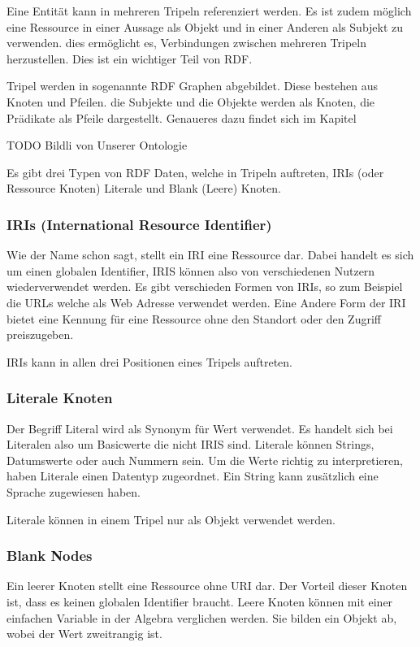 Eine Entität kann in mehreren Tripeln referenziert werden. Es ist zudem möglich eine Ressource in einer Aussage als Objekt und in einer Anderen als Subjekt zu verwenden. dies ermöglicht es, Verbindungen zwischen mehreren Tripeln herzustellen. Dies ist ein wichtiger Teil von RDF.

Tripel werden in sogenannte RDF Graphen abgebildet. Diese bestehen aus Knoten und Pfeilen. die Subjekte und die Objekte werden als Knoten, die Prädikate als Pfeile dargestellt. Genaueres dazu findet sich im Kapitel 



TODO Bildli von Unserer Ontologie

Es gibt drei Typen von RDF Daten, welche in Tripeln auftreten, IRIs (oder Ressource Knoten) Literale und Blank (Leere) Knoten.

\subsubsection{IRIs (International Resource Identifier)}
\label{sec:owlRdf_rdf_dataModel_iris}
Wie der Name schon sagt, stellt ein IRI  eine Ressource dar. Dabei handelt es sich um einen globalen Identifier, IRIS können also von verschiedenen Nutzern wiederverwendet werden. Es gibt verschieden Formen von IRIs, so zum Beispiel die URLs welche als Web Adresse verwendet werden. Eine Andere Form der IRI bietet eine Kennung für eine Ressource ohne den Standort oder den Zugriff preiszugeben.%

\noindent\hspace*{15mm}IRIs kann in allen drei Positionen eines Tripels auftreten.

\subsubsection{Literale Knoten}
\label{sec:owlRdf_rdf_dataModel_literal}
Der Begriff Literal wird als Synonym für Wert verwendet. Es handelt sich bei Literalen also um Basicwerte die nicht IRIS sind. Literale können Strings, Datumswerte oder auch Nummern sein. Um die Werte richtig zu interpretieren, haben Literale einen Datentyp zugeordnet. Ein String kann zusätzlich eine Sprache zugewiesen haben.

Literale können in einem Tripel nur als Objekt verwendet werden.

\subsubsection{Blank Nodes}
\label{sec:owlRdf_rdf_dataModel_blankNodes}
Ein leerer Knoten stellt eine Ressource ohne URI dar. Der Vorteil dieser Knoten ist, dass es keinen globalen Identifier braucht. Leere Knoten können mit einer einfachen Variable in der Algebra verglichen werden. Sie bilden ein Objekt ab, wobei der Wert zweitrangig ist. 

